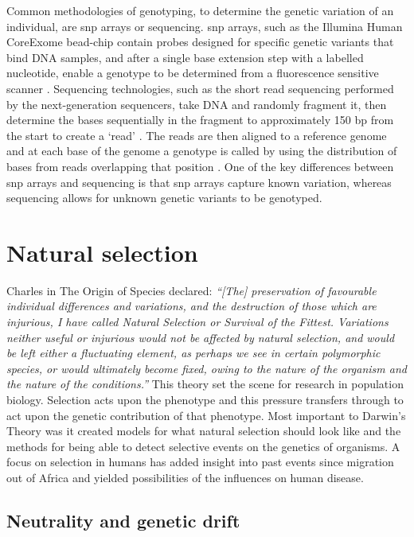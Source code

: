 \documentclass[twoside,openright]{report}
\begin{document}
Common methodologies of genotyping, to determine the genetic variation
of an individual, are \gls{snp} arrays or sequencing. \Gls{snp} arrays,
such as the Illumina Human CoreExome bead-chip contain probes designed
for specific genetic variants that bind DNA samples, and after a single
base extension step with a labelled nucleotide, enable a genotype to be
determined from a fluorescence sensitive scanner
\citep{Wang1998, Gunderson2005, Shen2005}. Sequencing technologies, such
as the short read sequencing performed by the next-generation
sequencers, take DNA and randomly fragment it, then determine the bases
sequentially in the fragment to approximately 150 bp from the start to
create a `read' \citep{Metzker2010}. The reads are then aligned to a
reference genome and at each base of the genome a genotype is called by
using the distribution of bases from reads overlapping that position
\citep{Li2008, mckenna2010genome}. One of the key differences between
\gls{snp} arrays and sequencing is that \gls{snp} arrays capture known
variation, whereas sequencing allows for unknown genetic variants to be
genotyped.

\section{Natural selection}\label{natural-selection}

Charles \citet{darwin1909origin} in The Origin of Species declared:
\emph{``{[}The{]} preservation of favourable individual differences and
variations, and the destruction of those which are injurious, I have
called Natural Selection or Survival of the Fittest. Variations neither
useful or injurious would not be affected by natural selection, and
would be left either a fluctuating element, as perhaps we see in certain
polymorphic species, or would ultimately become fixed, owing to the
nature of the organism and the nature of the conditions.''} This theory
set the scene for research in population biology. Selection acts upon
the phenotype and this pressure transfers through to act upon the
genetic contribution of that phenotype. Most important to Darwin's
Theory was it created models for what natural selection should look like
and the methods for being able to detect selective events on the
genetics of organisms. A focus on selection in humans has added insight
into past events since migration out of Africa \citep{Soares2012} and
yielded possibilities of the influences on human disease.

\subsection{Neutrality and genetic
drift}\label{neutrality-and-genetic-drift}
\end{document}
